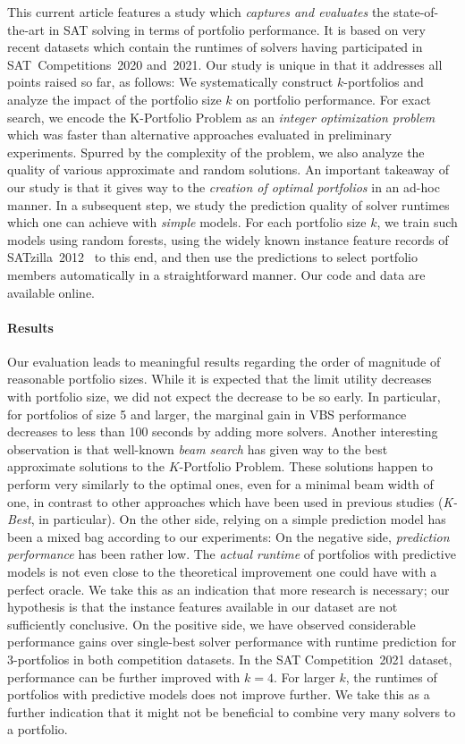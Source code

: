 \documentclass[conference]{IEEEtran}
\begin{document}
This current article features a study which \emph{captures and evaluates} the state-of-the-art in SAT solving in terms of portfolio performance. It is based on very recent datasets which contain the runtimes of solvers having participated in SAT~Competitions~2020 and~2021. Our study is unique in that it addresses all points raised so far, as follows:
We systematically construct $k$-portfolios and analyze the impact of the portfolio size $k$ on portfolio performance. 
For exact search, we encode the K-Portfolio Problem as an \emph{integer optimization problem} which was faster than alternative approaches evaluated in preliminary experiments. 
Spurred by the complexity of the problem, we also analyze the quality of various approximate and random solutions. 
An important takeaway of our study is that it gives way to the \emph{creation of optimal portfolios} in an ad-hoc manner. 
In a subsequent step, we study the prediction quality of solver runtimes which one can achieve with \emph{simple} models.
For each portfolio size $k$, we train such models using random forests, using the widely known instance feature records of SATzilla~2012~\cite{xu2012satzilla2012} to this end, and then use the predictions to select portfolio members automatically in a straightforward manner. 
Our code and data are available online.


\paragraph{Results}
Our evaluation leads to meaningful results regarding the order of magnitude of reasonable portfolio sizes. 
While it is expected that the limit utility decreases with portfolio size, we did not expect the decrease to be so early. 
In particular, for portfolios of size 5 and larger, the marginal gain in VBS performance decreases to less than 100 seconds by adding more solvers. 
Another interesting observation is that well-known \emph{beam search} has given way to the best approximate solutions to the $K$-Portfolio Problem. 
These solutions happen to perform very similarly to the optimal ones, even for a minimal beam width of one, in contrast to other approaches which have been used in previous studies (\emph{K-Best}, in particular). 
On the other side, relying on a simple prediction model has been a mixed bag according to our experiments: On the negative side, \emph{prediction performance} has been rather low. 
The \emph{actual runtime} of portfolios with predictive models is not even close to the theoretical improvement one could have with a perfect oracle.
We take this as an indication that more research is necessary; our hypothesis is that the instance features available in our dataset are not sufficiently conclusive. 
On the positive side, we have observed considerable performance gains over single-best solver performance with runtime prediction for $3$-portfolios in both competition datasets. 
In the SAT Competition~2021 dataset, performance can be further improved with $k = 4$. %
For larger $k$, the runtimes of portfolios with predictive models does not improve further. 
We take this as a further indication that it might not be beneficial to combine very many solvers to a portfolio. 
\end{document}
